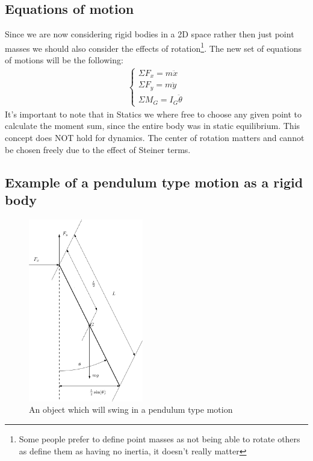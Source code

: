 \documentclass[11pt, a4paper]{article}
\begin{document}
\subsection{Equations of motion}
Since we are now considering rigid bodies in a 2D space rather then just point masses we should
also consider the effects of rotation\footnote{Some people prefer to define point masses as not being able
to rotate others as define them as having no inertia, it doesn't really matter}. The new set of equations
of motions will be the following:
\begin{gather}
  \begin{cases}
    \Sigma F_x = m\ddot{x}\\
    \Sigma F_y = m\ddot{y}\\
    \Sigma M_G = I_G\ddot{\theta}
  \end{cases}
\end{gather}
It's important to note that in Statics we where free to choose any given point to calculate the moment sum,
since the entire body was in static equilibrium. This concept does NOT hold for dynamics. The center of rotation
matters and cannot be chosen freely due to the effect of Steiner terms.

\subsection{Example of a pendulum type motion as a rigid body}
\begin{figure}[h]
  \centerline{\includegraphics[width=50mm]{images/pendulum.png}}
  \caption{An object which will swing in a pendulum type motion}
\end{figure}
\end{document}

